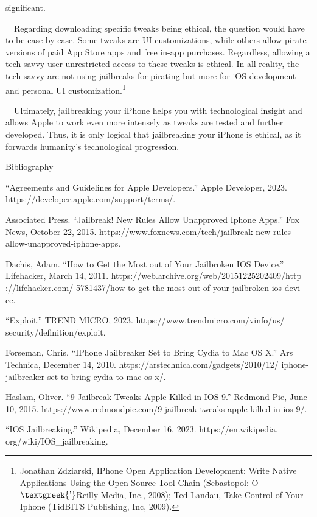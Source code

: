 \documentclass{article}
\begin{document}
significant.

\ \ Regarding downloading specific tweaks being ethical, the question would have to be case by case. Some tweaks are UI
customizations, while others allow pirate versions of paid App Store apps and free in-app purchases. Regardless,
allowing a tech-savvy user unrestricted access to these tweaks is ethical. In all reality, the tech-savvy are not using
jailbreaks for pirating but more for iOS development and personal UI customization.\footnote{Jonathan Zdziarski, IPhone
Open Application Development: Write Native Applications Using the Open Source Tool Chain (Sebastopol:
O$\text{\textgreek{’}}$Reilly Media, Inc., 2008); Ted Landau, Take Control of Your Iphone (TidBITS Publishing, Inc,
2009).}

\ \ Ultimately, jailbreaking your iPhone helps you with technological insight and allows Apple to work even more
intensely as tweaks are tested and further developed. Thus, it is only logical that jailbreaking your iPhone is
ethical, as it forwards humanity's technological progression.


\bigskip

\clearpage
Bibliography

“Agreements and Guidelines for Apple Developers.” Apple Developer, 2023. https://developer.apple.com/support/terms/.

Associated Press. “Jailbreak! New Rules Allow Unapproved Iphone Apps.” Fox News, October 22, 2015.
https://www.foxnews.com/tech/jailbreak-new-rules-allow-unapproved-iphone-apps.

Dachis, Adam. “How to Get the Most out of Your Jailbroken IOS Device.” Lifehacker, March 14, 2011.
https://web.archive.org/web/20151225202409/http ://lifehacker.com/
5781437/how-to-get-the-most-out-of-your-jailbroken-ios-devi ce.

“Exploit.” TREND MICRO, 2023. https://www.trendmicro.com/vinfo/us/ security/definition/exploit.

Forseman, Chris. “IPhone Jailbreaker Set to Bring Cydia to Mac OS X.” Ars Technica, December 14, 2010.
https://arstechnica.com/gadgets/2010/12/ iphone-jailbreaker-set-to-bring-cydia-to-mac-os-x/.

Haslam, Oliver. “9 Jailbreak Tweaks Apple Killed in IOS 9.” Redmond Pie, June 10, 2015.
https://www.redmondpie.com/9-jailbreak-tweaks-apple-killed-in-ios-9/.

“IOS Jailbreaking.” Wikipedia, December 16, 2023. https://en.wikipedia. org/wiki/IOS\_jailbreaking.
\end{document}
